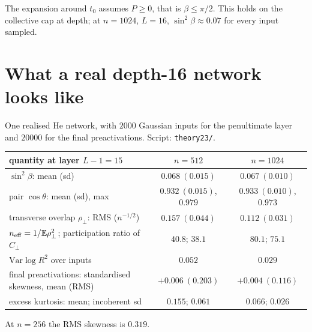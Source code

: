 \noindent The expansion around $t_0$ assumes $P\ge0$, that is $\beta\le\pi/2$. This holds on the collective cap at depth; at
$n=1024$, $L=16$, $\sin^2\beta\approx0.07$ for every input sampled.

\section{What a real depth-16 network looks like}\label{sec:real}
One realised He network, with $2000$ Gaussian inputs for the penultimate layer and $20000$ for the final
preactivations. Script: \texttt{theory23/}.
\begin{center}\small
\begin{tabular}{@{}lcc@{}}\toprule
quantity at layer $L-1=15$ & $n=512$ & $n=1024$\\\midrule
$\sin^2\beta$: mean (sd) & $0.068\ (0.015)$ & $0.067\ (0.010)$\\
pair $\cos\theta$: mean (sd), max & $0.932\ (0.015)$, $0.979$ & $0.933\ (0.010)$, $0.973$\\
transverse overlap $\rho_\perp$: RMS ($n^{-1/2}$) & $0.157\ (0.044)$ & $0.112\ (0.031)$\\
$n_{\rm eff}=1/\mathbb{E}\rho_\perp^2$; participation ratio of $C_\perp$ & $40.8$; $38.1$ & $80.1$; $75.1$\\
$\mathrm{Var}\log R^2$ over inputs & $0.052$ & $0.029$\\\midrule
final preactivations: standardised skewness, mean (RMS) & $+0.006\ (0.203)$ & $+0.004\ (0.116)$\\
excess kurtosis: mean; incoherent sd & $0.155$; $0.061$ & $0.066$; $0.026$\\\bottomrule
\end{tabular}
\end{center}
At $n=256$ the RMS skewness is $0.319$.

